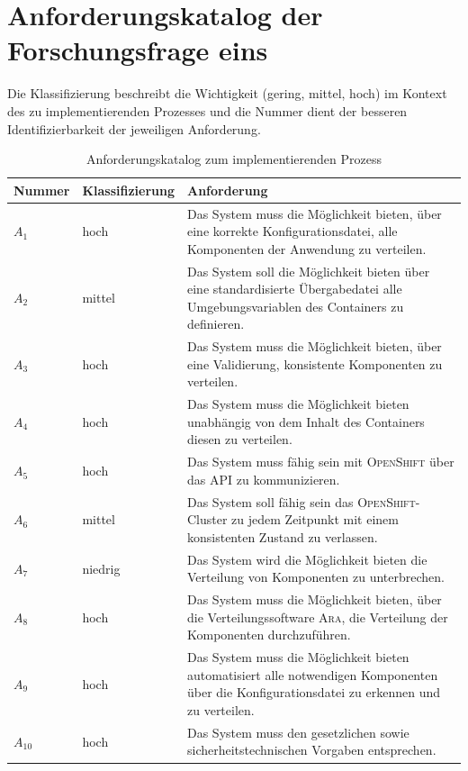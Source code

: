 \section{Anforderungskatalog der Forschungsfrage eins}
Die Klassifizierung beschreibt die Wichtigkeit (gering, mittel, hoch) im Kontext des
zu implementierenden Prozesses und die Nummer dient der besseren Identifizierbarkeit der jeweiligen Anforderung.
\begin{table}[h!]
	\centering
	
	\begin{tabular}{@{}llp{9.0cm}@{}}\toprule[1.5pt]
		
		\textbf{Nummer} & \textbf{Klassifizierung} & \textbf{Anforderung} \\ \midrule
		
		$A_{1}$ & hoch & Das System muss die Möglichkeit bieten, über eine korrekte Konfigurationsdatei, alle Komponenten der Anwendung zu verteilen.           \\
		$A_{2}$ & mittel & Das System soll die Möglichkeit bieten über eine standardisierte Übergabedatei alle Umgebungsvariablen des Containers zu definieren. \\
		$A_{3}$ & hoch & Das System muss die Möglichkeit bieten, über eine Validierung, konsistente Komponenten zu verteilen.\\
		$A_{4}$ & hoch & Das System muss die Möglichkeit bieten unabhängig von dem Inhalt des Containers diesen zu verteilen.\\
		$A_{5}$ & hoch & Das System muss fähig sein mit \textsc{OpenShift} über das \ac{API} zu kommunizieren. \\
		$A_{6}$ & mittel & Das System soll fähig sein das \textsc{OpenShift}-Cluster zu jedem Zeitpunkt mit einem konsistenten Zustand zu verlassen. \\
		$A_{7}$ & niedrig & Das System wird die Möglichkeit bieten die Verteilung von Komponenten zu unterbrechen. \\
		$A_{8}$ & hoch & Das System muss die Möglichkeit bieten, über die Verteilungssoftware \textsc{Ara}, die Verteilung der Komponenten durchzuführen. \\
		$A_{9}$ & hoch & Das System muss die Möglichkeit bieten automatisiert alle notwendigen Komponenten über die Konfigurationsdatei zu erkennen und zu verteilen. \\
		$A_{10}$ & hoch & Das System muss den gesetzlichen sowie sicherheitstechnischen Vorgaben entsprechen.\\
		
		\bottomrule[1.5pt]
	\end{tabular}
	
	\caption{Anforderungskatalog zum implementierenden Prozess}
	\label{tab:anforderungslisteFF1}
	
\end{table}

